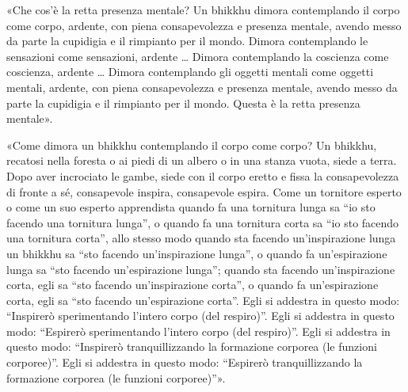  «Che cos’è la retta presenza mentale? Un bhikkhu dimora
contemplando il corpo come corpo, ardente, con piena consapevolezza e presenza
mentale, avendo messo da parte la cupidigia e il rimpianto per il mondo. Dimora
contemplando le sensazioni come sensazioni, ardente … Dimora contemplando la
coscienza come coscienza, ardente … Dimora contemplando gli oggetti mentali come
oggetti mentali, ardente, con piena consapevolezza e presenza mentale, avendo
messo da parte la cupidigia e il rimpianto per il mondo. Questa è la retta
presenza mentale».


«Come dimora un bhikkhu contemplando il corpo come corpo? Un bhikkhu, recatosi
nella foresta o ai piedi di un albero o in una stanza vuota, siede a terra. Dopo
aver incrociato le gambe, siede con il corpo eretto e fissa la consapevolezza di
fronte a sé, consapevole inspira, consapevole espira.
Come un tornitore esperto o come un suo esperto apprendista quando fa una
tornitura lunga sa “io sto facendo una tornitura lunga”, o quando fa una
tornitura corta sa “io sto facendo una tornitura corta”, allo stesso modo quando
sta facendo un’inspirazione lunga un bhikkhu sa “sto facendo un’inspirazione
lunga”, o quando fa un’espirazione lunga sa “sto facendo un’espirazione lunga”;
quando sta facendo un’inspirazione corta, egli sa “sto facendo un’inspirazione
corta”, o quando fa un’espirazione corta, egli sa “sto facendo un’espirazione
corta”. Egli si addestra in questo modo: “Inspirerò sperimentando l’intero corpo
(del respiro)”. Egli si addestra in questo modo: “Espirerò sperimentando
l’intero corpo (del respiro)”. Egli si addestra in questo modo: “Inspirerò
tranquillizzando la formazione corporea (le funzioni corporee)”. Egli si
addestra in questo modo: “Espirerò tranquillizzando la formazione corporea (le
funzioni corporee)”».

